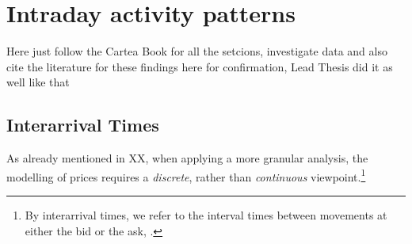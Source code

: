 \documentclass[12pt,a4paper]{cau_thesis}
\begin{document}
\section{Intraday activity patterns}\label{sec:intraday_activity_patterns}
Here just follow the Cartea Book for all the setcions, investigate
data and also cite the literature for these findings here for
confirmation, Lead Thesis did it as well like that
\subsection{Interarrival Times}\label{sub_sec:interarrival_times}
As already mentioned in XX, when applying a more granular analysis,
the modelling of prices requires a \emph{discrete}, rather than
\emph{continuous} viewpoint.\footnote{By interarrival times, we refer
    to the interval times between movements at either the bid or the ask,
    \cite[see ][, p.48]{cartea2015algorithmic}.}
\end{document}
